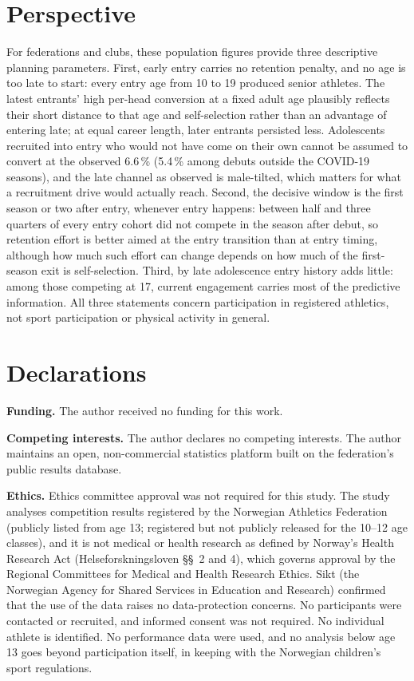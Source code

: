 \documentclass[12pt,a4paper]{article}
\begin{document}
\section{Perspective}

For federations and clubs, these population figures provide three descriptive planning parameters. First, early entry carries no retention penalty, and no age is too late to start: every entry age from 10 to 19 produced senior athletes. The latest entrants' high per-head conversion at a fixed adult age plausibly reflects their short distance to that age and self-selection rather than an advantage of entering late; at equal career length, later entrants persisted less. Adolescents recruited into entry who would not have come on their own cannot be assumed to convert at the observed 6.6\,\% (5.4\,\% among debuts outside the COVID-19 seasons), and the late channel as observed is male-tilted, which matters for what a recruitment drive would actually reach. Second, the decisive window is the first season or two after entry, whenever entry happens: between half and three quarters of every entry cohort did not compete in the season after debut, so retention effort is better aimed at the entry transition than at entry timing, although how much such effort can change depends on how much of the first-season exit is self-selection. Third, by late adolescence entry history adds little: among those competing at 17, current engagement carries most of the predictive information. All three statements concern participation in registered athletics, not sport participation or physical activity in general.


\section*{Declarations}

\noindent\textbf{Funding.} The author received no funding for this work.

\medskip\noindent\textbf{Competing interests.} The author declares no competing interests. The author maintains an open, non-commercial statistics platform built on the federation's public results database.

\medskip\noindent\textbf{Ethics.} Ethics committee approval was not required for this study. The study analyses competition results registered by the Norwegian Athletics Federation (publicly listed from age 13; registered but not publicly released for the 10--12 age classes), and it is not medical or health research as defined by Norway's Health Research Act (Helseforskningsloven \S\S~2 and 4), which governs approval by the Regional Committees for Medical and Health Research Ethics. Sikt (the Norwegian Agency for Shared Services in Education and Research) confirmed that the use of the data raises no data-protection concerns. No participants were contacted or recruited, and informed consent was not required. No individual athlete is identified. No performance data were used, and no analysis below age 13 goes beyond participation itself, in keeping with the Norwegian children's sport regulations.
\end{document}
